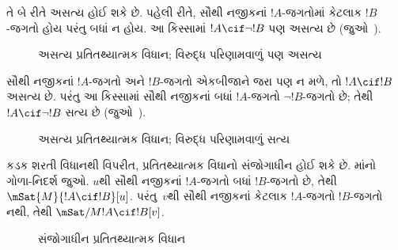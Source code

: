 તે બે રીતે અસત્ય હોઈ શકે છે. પહેલી રીતે, સૌથી નજીકનાં $!A$-જગતોમાં
કેટલાક $!B$-જગતો હોય પરંતુ બધાં ન હોય. આ કિસ્સામાં
$!A \cif \lnot !B$ પણ અસત્ય છે (જુઓ~).
\begin{figure}
\begin{center}
\caption{અસત્ય પ્રતિતથ્યાત્મક વિધાન; વિરુદ્ધ પરિણામવાળું પણ અસત્ય}
\end{center}
\end{figure}
સૌથી નજીકનાં $!A$-જગતો અને $!B$-જગતો એકબીજાને જરા પણ ન મળે,
તો $!A \cif !B$ અસત્ય છે. પરંતુ આ કિસ્સામાં સૌથી નજીકનાં બધાં
$!A$-જગતો $\lnot !B$-જગતો છે; તેથી $!A \cif \lnot !B$ સત્ય છે
(જુઓ~).
\begin{figure}
\begin{center}
\caption{અસત્ય પ્રતિતથ્યાત્મક વિધાન; વિરુદ્ધ પરિણામવાળું સત્ય}
\end{center}
\end{figure}

કડક શરતી વિધાનથી વિપરીત, પ્રતિતથ્યાત્મક વિધાનો સંજોગાધીન હોઈ શકે
છે. માંનો ગોળા-નિદર્શ જુઓ. $u$થી સૌથી નજીકનાં
$!A$-જગતો બધાં $!B$-જગતો છે, તેથી $\mSat{M}{!A \cif
  !B}[u]$. પરંતુ~$v$થી સૌથી નજીકનાં કેટલાક $!A$-જગતો $!B$-જગતો
નથી, તેથી $\mSat/{M}{!A \cif !B}[v]$.
\begin{figure}
\begin{center}
\end{center}
\caption{સંજોગાધીન પ્રતિતથ્યાત્મક વિધાન}
\end{figure}
\endgroup


